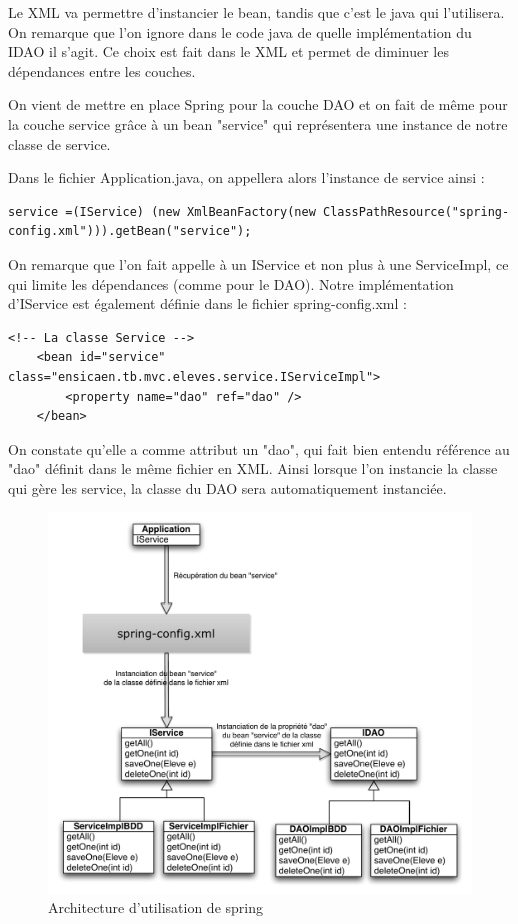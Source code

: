 \documentclass[a4paper,12pt]{article}
\begin{document}
Le XML va permettre d'instancier le bean, tandis que c'est le java qui l'utilisera.
On remarque que l'on ignore dans le code java de quelle implémentation du IDAO il s'agit. Ce choix est fait dans le XML et permet de diminuer les dépendances entre les couches.

On vient de mettre en place Spring pour la couche DAO et on fait de même pour la couche service grâce à un bean "service" qui représentera une instance de notre classe de service.

Dans le fichier Application.java, on appellera alors l'instance de service ainsi : 

\begin{lstlisting}
service =(IService) (new XmlBeanFactory(new ClassPathResource("spring-config.xml"))).getBean("service");
\end{lstlisting}

On remarque que l'on fait appelle à un IService et non plus à une ServiceImpl, ce qui limite les dépendances (comme pour le DAO).
Notre implémentation d'IService est également définie dans le fichier spring-config.xml :

\begin{lstlisting}
<!-- La classe Service -->
	<bean id="service" class="ensicaen.tb.mvc.eleves.service.IServiceImpl">
		<property name="dao" ref="dao" />
	</bean>
\end{lstlisting}

On constate qu'elle a comme attribut un "dao", qui fait bien entendu référence au "dao" définit dans le même fichier en XML. Ainsi lorsque l'on
instancie la classe qui gère les service, la classe du DAO sera automatiquement instanciée.

\begin{figure}[H]
	\center
	\includegraphics[width=15cm]{img/spring.pdf}
	\caption{Architecture d'utilisation de spring}
\end{figure}
\newpage
\end{document}
